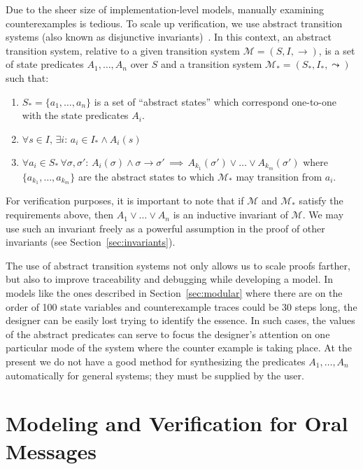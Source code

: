 \documentclass{llncs/llncs}
\newcommand{\tld}[1]{#1_{*}\xspace}
\begin{document}
Due to the sheer size of implementation-level models, manually examining counterexamples is tedious. To scale up verification, we use abstract transition systems (also known as disjunctive invariants)~\cite{Rushby00:CAV,timed-systems}. In this context, an abstract transition system, relative to a given transition system $\mathcal{M} = (S, I, \rightarrow)$, is a set of state predicates $A_1, \ldots, A_n$ over $S$ and a transition system $\tld{\mathcal{M}} = (\tld{S}, \tld{I}, \leadsto)$ such that:

\begin{enumerate}
    \item $\tld{S} = \{a_1, \ldots, a_n\}$ is a set of ``abstract states'' which correspond one-to-one with the state predicates $A_i$.
    \item $\forall s \in I, \, \exists i : \, a_i \in \tld{I} \wedge A_i(s)$
    \item $\forall a_i \in \tld{S} \, \forall \sigma, \sigma' : \, A_i(\sigma) \wedge \sigma \rightarrow \sigma' \, \implies \, A_{k_1}(\sigma') \vee \ldots \vee A_{k_m}(\sigma')$ where $\{a_{k_1}, \ldots, a_{k_m}\}$ are the abstract states to which $\tld{\mathcal{M}}$ may transition from $a_i$.
\end{enumerate}

For verification purposes, it is important to note that if $\mathcal{M}$ and $\tld{\mathcal{M}}$ satisfy the requirements above, then $A_1 \vee \ldots \vee A_n$ is an inductive invariant of $\mathcal{M}$. We may use such an invariant freely as a powerful assumption in the proof of other invariants (see Section~\ref{sec:invariants}).

The use of abstract transition systems not only allows us to scale proofs farther, but also to improve traceability and debugging while developing a model. In models like the ones described in Section~\ref{sec:modular} where there are on the order of 100 state variables and counterexample traces could be 30 steps long, the designer can be easily lost trying to identify the essence. In such cases, the values of the abstract predicates can serve to focus the designer's attention on one particular mode of the system where the counter example is taking place. At the present we do not have a good method for synthesizing the predicates $A_1, \dots, A_n$ automatically for general systems; they must be supplied by the user.


\section{Modeling and Verification for Oral Messages}\label{sec:byz}
\end{document}
